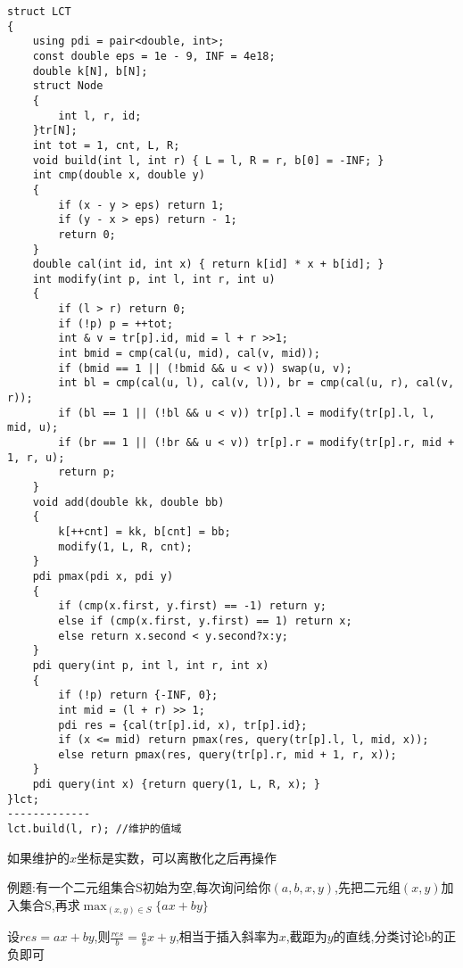 \documentclass[a4paper, fontset=none]{ctexart}
\begin{document}
\begin{verbatim}
struct LCT
{
    using pdi = pair<double, int>;
    const double eps = 1e - 9, INF = 4e18;
    double k[N], b[N];
    struct Node
    {
        int l, r, id;
    }tr[N];
    int tot = 1, cnt, L, R;
    void build(int l, int r) { L = l, R = r, b[0] = -INF; }
    int cmp(double x, double y)
    {
        if (x - y > eps) return 1;
        if (y - x > eps) return - 1;
        return 0;
    }
    double cal(int id, int x) { return k[id] * x + b[id]; }
    int modify(int p, int l, int r, int u)
    {
        if (l > r) return 0;
        if (!p) p = ++tot;
        int & v = tr[p].id, mid = l + r >>1;
        int bmid = cmp(cal(u, mid), cal(v, mid));
        if (bmid == 1 || (!bmid && u < v)) swap(u, v);
        int bl = cmp(cal(u, l), cal(v, l)), br = cmp(cal(u, r), cal(v, r));
        if (bl == 1 || (!bl && u < v)) tr[p].l = modify(tr[p].l, l, mid, u);
        if (br == 1 || (!br && u < v)) tr[p].r = modify(tr[p].r, mid + 1, r, u);
        return p;
    }
    void add(double kk, double bb)
    {
        k[++cnt] = kk, b[cnt] = bb;
        modify(1, L, R, cnt);
    }
    pdi pmax(pdi x, pdi y)
    {
        if (cmp(x.first, y.first) == -1) return y;
        else if (cmp(x.first, y.first) == 1) return x;
        else return x.second < y.second?x:y;
    }
    pdi query(int p, int l, int r, int x)
    {
        if (!p) return {-INF, 0};
        int mid = (l + r) >> 1;
        pdi res = {cal(tr[p].id, x), tr[p].id};
        if (x <= mid) return pmax(res, query(tr[p].l, l, mid, x));
        else return pmax(res, query(tr[p].r, mid + 1, r, x));
    }
    pdi query(int x) {return query(1, L, R, x); }
}lct;
-------------
lct.build(l, r); //维护的值域
\end{verbatim}

如果维护的$x$坐标是实数，可以离散化之后再操作

例题:有一个二元组集合S初始为空,每次询问给你$(a, b, x, y)$,先把二元组$(x, y)$加入集合S,再求$\max_{(x, y)\in S}\{ax+by\}$

设$res=ax+by$,则$\frac{res}{b}=\frac{a}{b}x+y$,相当于插入斜率为$x$,截距为$y$的直线,分类讨论b的正负即可
\end{document}
